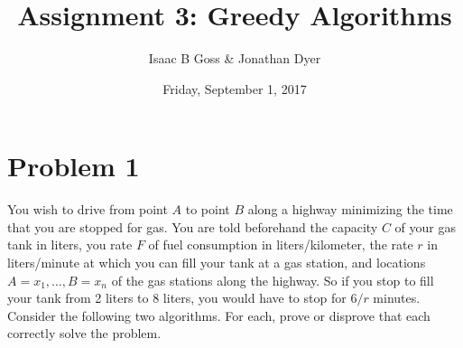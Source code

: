 \documentclass{article}
\author{Isaac B Goss \& Jonathan Dyer}
\title{Assignment 3: Greedy Algorithms}
\date{Friday, September 1, 2017}
\providecommand{\prob}[1]{\section*{Problem #1}}
\begin{document}
\maketitle

    \prob{1}
    You wish to drive from point $A$ to point $B$ along a highway minimizing the time that you are stopped for gas. You are told beforehand the capacity $C$ of your gas tank in liters, you rate $F$ of fuel consumption in liters/kilometer, the rate $r$ in liters/minute at which you can fill your tank at a gas station, and locations $A = x_1, \dots, B = x_n$ of the gas stations along the highway. So if you stop to fill your tank from 2 liters to 8 liters, you would have to stop for $6/r$ minutes. Consider the following two algorithms. For each, prove or disprove that each correctly solve the problem.
    
\end{document}
